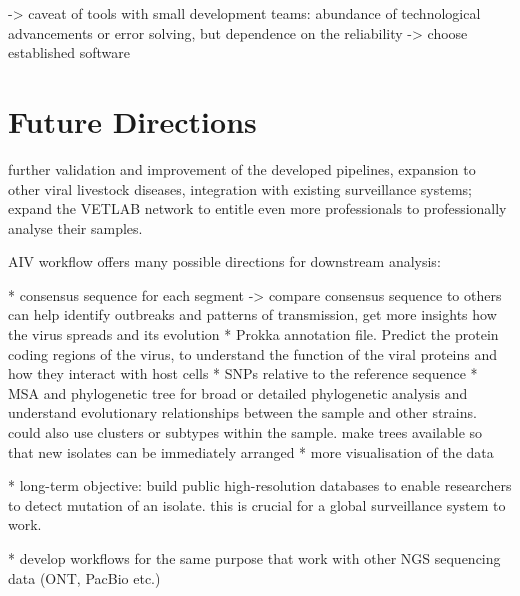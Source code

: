 -> caveat of tools with small development teams: abundance of technological advancements or error solving, but dependence on the reliability -> choose established software



\section{Future Directions}
\todoit
further validation and improvement of the developed pipelines, expansion to other viral livestock diseases, integration with existing surveillance systems; expand the \ac{VETLAB} network to entitle even more professionals to professionally analyse their samples.

\ac{AIV} workflow offers many possible directions for downstream analysis:

* consensus sequence for each segment -> compare consensus sequence to others can help identify outbreaks and patterns of transmission, get more insights how the virus spreads and its evolution
* Prokka annotation file. Predict the protein coding regions of the virus, to understand the function of the viral proteins and how they interact with host cells
* SNPs relative to the reference sequence
* \ac{MSA} and phylogenetic tree for broad or detailed phylogenetic analysis and understand evolutionary relationships between the sample and other strains. could also use clusters or subtypes within the sample. make trees available so that new isolates can be immediately arranged
* more visualisation of the data

* long-term objective: build public high-resolution databases to enable researchers to detect mutation of an isolate. this is crucial for a global surveillance system to work.

* develop workflows for the same purpose that work with other NGS sequencing data (ONT, PacBio etc.)